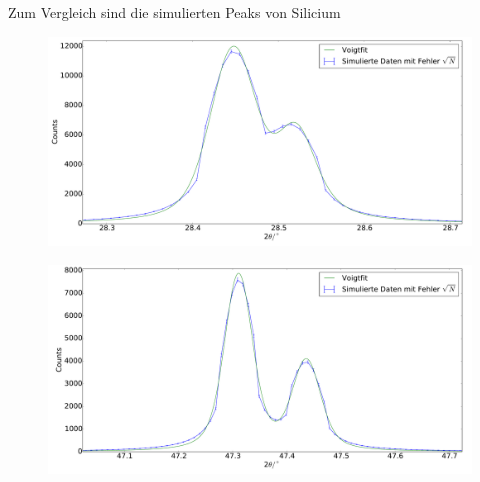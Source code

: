 Zum Vergleich sind die simulierten Peaks von Silicium
\begin{figure}[H]
\begin{minipage}{.52\textwidth}
  \centering
  \includegraphics[scale=0.18]{Simulation_Siliciumpulver_1}
  \label{fig:pul_sim_sil_1}
\end{minipage}
\hspace{0.2cm}
\begin{minipage}{.5\textwidth}
  \centering
  \includegraphics[scale=0.18]{Simulation_Siliciumpulver_2}
  \label{fig:pul_sim_sil_2}
\end{minipage}
\end{figure}
